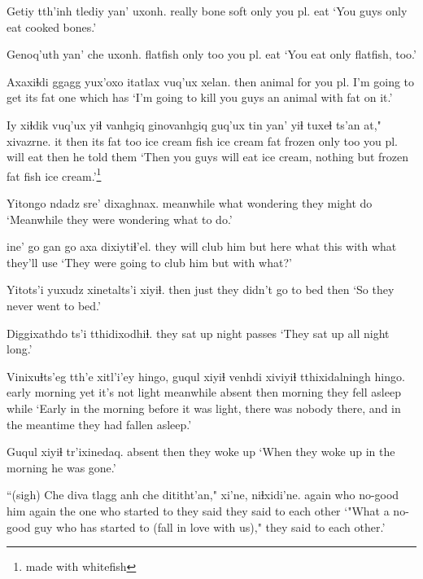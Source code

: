 \documentclass[12pt]{article}
\begin{document}
\gll Getiy  tth'inh tlediy yan' uxonh.
really bone    soft   only {you pl. eat}
\glt `You guys only eat cooked bones.'
\glend

\gll Genoq'uth yan' che uxonh.
flatfish  only too {you pl. eat}
\glt `You eat only flatfish, too.'
\glend

\gll Axaxiɬdi ggagg  yux'oxo     itatlax          vuq'ux  xelan.
then     animal {for you pl.} {I'm going to get} {its fat} {one which has}
\glt `I'm going to kill you guys an animal with fat on it.'
\glend

\gll Iy xiɬdik vuq'ux  yiɬ vanhgiq   ginovanhgiq    guq'ux tin    yan' yiɬ tuxeɬ            ts'an at," xivazrne.
it then   {its fat} too {ice cream} {fish ice cream} fat    frozen only too {you pl. will eat}  then    {}      { he told them}
\glt `Then you guys will eat ice cream, nothing but frozen fat fish ice cream.'\footnote{made with whitefish}
\glend

\gll Yitongo   ndadz sre'      dixaghnax.
meanwhile what  wondering {they might do}
\glt `Meanwhile they were wondering what to do.'
\glend

 ine' go   gan  go   axa  dixiytiɬ'el.
{they will club him}  but  here what this with {what they'll use }
\glt `They were going to club him but with what?'
\glend

\gll Yitots'i yuxudz xinetalts'i  xiyiɬ.
then     just   {they didn't go to bed} then  
\glt `So they never went to bed.'
\glend

\gll Diggixathdo ts'i tthidixodhiɬ.
{they sat up}  {}    {night passes}
\glt `They sat up all night long.'
\glend

\gll Vinixuɬts'eg   tth'e xitl'i'ey  hingo, guqul  xiyiɬ venhdi  {xiviyiɬ tthixidalningh} hingo.
{early morning} {yet} {it's not light} meanwhile absent then  morning {they fell asleep}       while
\glt `Early in the morning before it was light, there was nobody there, and in the meantime they had fallen asleep.'
\glend

\gll Guqul  xiyiɬ tr'ixinedaq. 
absent then  {they woke up}
\glt `When they woke up in the morning he was gone.'
\glend

\gll ``(sigh) Che   diva tlagg   anh che   dititht'an,"  xi'ne,    niɬxidi'ne.
{} again who  no-good him  again {the one who started to} {they said} {they said to each other}
\glt `"What a no-good guy who has started to (fall in love with us)," they said to each other.'
\glend
\end{document}
